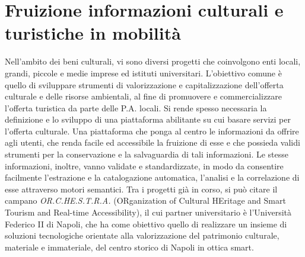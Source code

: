 \section{Fruizione informazioni culturali e turistiche in mobilità}
Nell'ambito dei beni culturali, vi sono diversi progetti che coinvolgono enti locali, grandi, piccole e medie imprese ed istituti universitari.
L'obiettivo comune è quello di sviluppare strumenti di valorizzazione e capitalizzazione dell'offerta culturale e delle risorse ambientali, al fine di promuovere e commercializzare l'offerta turistica da parte delle P.A. locali.
Si rende spesso necessaria la definizione e lo sviluppo di una piattaforma abilitante su cui basare servizi per l'offerta culturale. Una piattaforma che ponga al centro le informazioni da offrire agli utenti, che renda facile ed accessibile la fruizione di esse e che possieda validi strumenti per la conservazione e la salvaguardia di tali informazioni.
Le stesse informazioni, inoltre, vanno validate e standardizzate, in modo da consentire facilmente l'estrazione e la catalogazione automatica, l'analisi e la correlazione di esse attraverso motori semantici.
Tra i progetti già in corso, si può citare il campano
\emph{OR.C.HE.S.T.R.A.} (ORganization of Cultural HEritage and Smart Tourism and Real-time Accessibility), il cui partner universitario è l'Università Federico II di Napoli, che ha come obiettivo quello di realizzare un insieme di soluzioni tecnologiche orientate alla valorizzazione del patrimonio culturale, materiale e immateriale, del centro storico di Napoli in ottica smart. 


